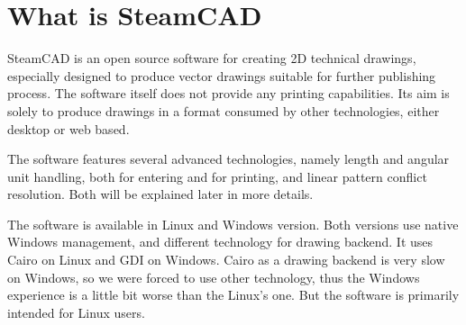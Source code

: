 \pagestyle{empty}
\begin{center}
\vspace*{-2.2cm}
\hspace*{-0.7cm}
\end{center}
\newpage

\pagestyle{headings}

\section{What is SteamCAD}

SteamCAD is an open source software for creating 2D technical drawings, especially designed to 
produce vector drawings suitable for further publishing process. The software itself does not
provide any printing capabilities. Its aim is solely to produce drawings in a format consumed
by other technologies, either desktop or web based.

The software features several advanced technologies, namely length and angular unit handling, both
for entering and for printing, and linear pattern conflict resolution. Both will be explained
later in more details.

The software is available in Linux and Windows version. Both versions use native Windows
management, and different technology for drawing backend. It uses Cairo on Linux and GDI on
Windows. Cairo as a drawing backend is very slow on Windows, so we were forced to use other
technology, thus the Windows experience is a little bit worse than the Linux's one. But the
software is primarily intended for Linux users.

